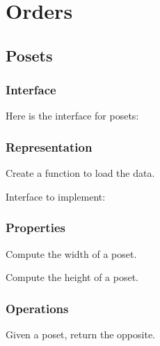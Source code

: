\chapter{Orders}


\section{Posets}

\subsection{Interface}

Here is the interface for posets:

%

\subsection{Representation}


\begin{exercise}[Representation]
  Create a function to load the data.

  Interface to implement:
%

\end{exercise}

\subsection{Properties}


\begin{exercise}
  Compute the width of a poset.
\end{exercise}

\begin{exercise}
  Compute the height of a poset.
\end{exercise}

\subsection{Operations}


\begin{exercise}
  Given a poset, return the opposite.
\end{exercise}

